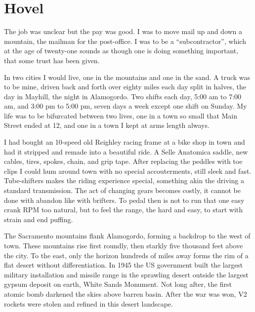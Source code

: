 \documentclass[ebook, 10pt, openright, onecolumn]{memoir}
\newlength{\drop}
\newcommand*\td[1]{
  \todo[inline]{
     #1 
  }
}
\newcommand*\finish{\td{ ----- Finish this section -----}}
\begin{document}
\chapter{Hovel}
\label{cha:hovel}

The job was unclear but the pay was good.  I was to move mail up and down a
mountain, the mailman for the post-office.  I was to be a ``subcontractor'', which
at the age of twenty-one sounds as though one is doing something important, that
some trust has been given.

In two cities I would live, one in the mountains and one in the sand.  A truck
was to be mine, driven back and forth over eighty miles each day split in
halves, the day in Mayhill, the night in Alamogordo.  Two shifts each day, 5:00
am to 7:00 am, and 3:00 pm to 5:00 pm, seven days a week except one shift on
Sunday.  My life was to be bifurcated between two lives, one in a town so small
that Main Street ended at 12, and one in a town I kept at arms length always.

I had bought an 10-speed old Reighley racing frame at a bike shop in town and
had it stripped and remade into a beautiful ride.  A Selle Anatomica saddle, new
cables, tires, spokes, chain, and grip tape.  After replacing the peddles with
toe clips I could hum around town with no special accouterments, still sleek and
fast. Tube-shifters makes the riding experience special, something akin the
driving a standard transmission.  The act of changing gears becomes costly, it
cannot be done with abandon like with brifters.  To pedal then is not to run
that one easy crank RPM too natural, but to feel the range, the hard and easy,
to start with strain and end puffing.

The Sacramento mountains flank Alamogordo, forming a backdrop to the west of
town.  These mountains rise first roundly, then starkly five thousand feet above
the city.  To the east, only the horizon hundreds of miles away forms the rim of
a flat desert without differentiation.  In 1945 the US government built the
largest military installation and missile range in the sprawling desert outside
the largest gypsum deposit on earth, White Sands Monument.  Not long after,
the first atomic bomb darkened the skies above barren basin. After the war
was won, V2 rockets were stolen and refined in this desert landscape.

\finish
\end{document}
